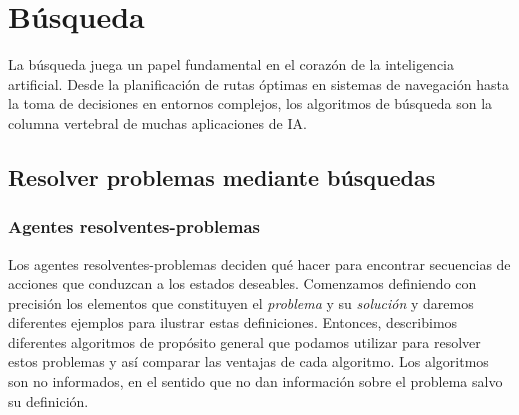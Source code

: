 \section{Búsqueda}

La búsqueda juega un papel fundamental en el corazón de la inteligencia artificial. Desde la planificación
de rutas óptimas en sistemas de navegación hasta la toma de decisiones en entornos complejos, 
los algoritmos de búsqueda son la columna vertebral de muchas aplicaciones de IA.\\ 

\subsection{Resolver problemas mediante búsquedas}

\subsubsection*{Agentes resolventes-problemas}

Los agentes resolventes-problemas deciden qué hacer para encontrar secuencias de acciones que conduzcan 
a los estados deseables. Comenzamos definiendo con precisión los elementos que constituyen el 
\textit{problema} y su \textit{solución} y daremos diferentes ejemplos para ilustrar estas 
definiciones. Entonces, describimos diferentes algoritmos de propósito general que podamos utilizar 
para resolver estos problemas y así comparar las ventajas de cada algoritmo. Los algoritmos son no 
informados, en el sentido que no dan información sobre el problema salvo su definición.\\ 


